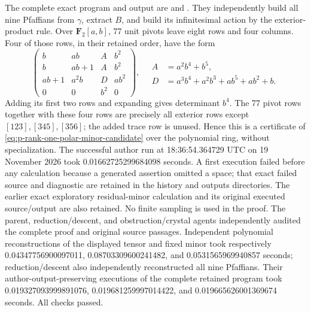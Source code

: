 \begin{remark}
\label{rem:p-rank-one-polar-unit-certificate-candidate}
The complete exact program and output are
and
.
They independently build all nine Pfaffians from $\gamma$, extract
$B$, and build its infinitesimal action by the exterior-product rule.
Over $\mathbf F_2[a,b]$, 77 unit pivots leave eight rows and four
columns. Four of those rows, in their retained order, have the form
\[
 \begin{pmatrix}
 b&ab&A&b^2\\
 b&ab+1&A&b^2\\
 ab+1&a^2b&D&ab^2\\
 0&0&b^2&0
 \end{pmatrix},
\quad
 \begin{aligned}
 A&=a^2b^4+b^5,\\
 D&=a^3b^4+a^2b^3+ab^5+ab^2+b.
 \end{aligned}
\]
Adding its first two rows and expanding gives determinant $b^4$.
The 77 pivot rows together with these four rows are precisely all
exterior rows except $[123],[345],[356]$; the added trace row is
unused. Hence this is a certificate of
\eqref{eq:p-rank-one-polar-minor-candidate} over the polynomial ring,
without specialization. The successful author run at
18:36:54.364729 UTC on 19 November 2026 took
0.01662725299684098 seconds. A first execution failed before any
calculation because a generated assertion omitted a space;
that exact failed source and diagnostic are retained in the history
and outputs directories. The earlier exact exploratory residual-minor
calculation and its original executed source/output are also retained.
No finite sampling is used in the proof. The parent, reduction/descent,
and obstruction/crystal agents independently audited the complete proof
and original source passages. Independent polynomial reconstructions of
the displayed tensor and fixed minor took respectively
0.04347756900097011, 0.08703309600241482, and
0.0531565969940857 seconds; reduction/descent also independently
reconstructed all nine Pfaffians. Their author-output-preserving
executions of the complete retained program took
0.019327093999891076, 0.019681259997014422, and
0.019665626001369674 seconds. All checks passed.
\end{remark}

